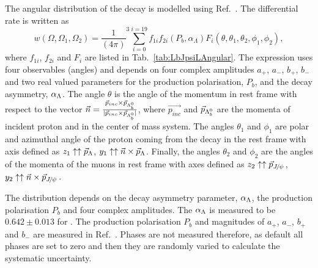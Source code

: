%
%
The angular distribution of the \Lb\ra\jpsi\Lz decay is modelled using Ref.~\cite{Hrivnac:1994jx}.
The differential rate is written as
%
    \begin{equation}\label{eq:jpsiLambdaRate}
       w(\Omega ,\Omega_{1}, \Omega_{2}) =  {\frac{1}{(4\pi)}^{3}}
       \sum_{i=0}^{i=19} f_{1i} f_{2i}(P_{b} ,\alpha_{\Lambda}) F_{i}(\theta,
       \theta_{1},\theta_{2},\phi_{1},\phi_{2}),
      \end{equation}
where $f_{1i}$, $f_{2i}$ and $F_i$ are listed in Tab.~\ref{tab:LbJpsiLAngular}. The expression uses
four observables (angles) and depends on four complex amplitudes $a_+$, $a_-$, $b_+$, $b_-$ and two
real valued parameters for the production polarisation, $P_b$, and the \Lz decay asymmetry, $\alpha_\Lambda$.
The angle $\theta$ is the angle of the \Lz momentum in \Lb rest frame with respect to
the vector $\vec{n}=\frac{\vec{p}_{inc} \times \vec{p}_{\Lambda^0_b}} { |\vec{p}_{inc} \times \vec{p}_{\Lambda^0_b}|}$, where
$\vec{p_{inc}}$ and $\vec{p}_{\Lambda^0_b}$ are the momenta of incident proton and \Lb in the center of mass system.
The angles $\theta_1$ and $\phi_1$ are polar and azimuthal angle of the proton coming from the \Lz decay
in the \Lz rest frame with axis defined as
    $z_{1}\uparrow\uparrow\vec{p}_{\Lambda}$,
    $y_{1}\uparrow\uparrow\vec{n}\times\vec{p}_{\Lambda}$.
Finally, the angles $\theta_2$ and $\phi_2$ are the angles of the momenta of the muons in \jpsi rest frame
with axes defined as 
    $z_{2}\uparrow\uparrow\vec{p}_{\jpsi}$,
    $y_{2}\uparrow\uparrow\vec{n}\times\vec{p}_{\jpsi}$.

The distribution depends on the \Lz decay asymmetry parameter, $\alpha_\Lambda$, the production polarisation
$P_b$ and four complex amplitudes. The $\alpha_\Lambda$ is measured to be $0.642 \pm 0.013$ for \Lz.
The production polarisation $P_b$ and magnitudes of $a_+$, $a_-$, $b_+$ and $b_-$ are measured in
Ref.~\cite{LHCb-PAPER-2012-057}. Phases are not measured therefore, as default all phases are set to
zero and then they are randomly varied to calculate the systematic uncertainty.


